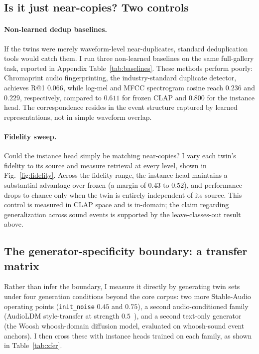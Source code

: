 \documentclass{article}
\begin{document}
\subsection{Is it just near-copies? Two controls}
\paragraph{Non-learned dedup baselines.} If the twins were merely waveform-level near-duplicates, standard deduplication tools would catch them. I run three non-learned baselines on the same full-gallery task, reported in Appendix Table~\ref{tab:baselines}. These methods perform poorly: Chromaprint audio fingerprinting, the industry-standard duplicate detector, achieves R@1 $0.066$, while log-mel and MFCC spectrogram cosine reach $0.236$ and $0.229$, respectively, compared to $0.611$ for frozen CLAP and $0.800$ for the instance head. The correspondence resides in the event structure captured by learned representations, not in simple waveform overlap.

\paragraph{Fidelity sweep.} Could the instance head simply be matching near-copies? I vary each twin's fidelity to its source and measure retrieval at every level, shown in Fig.~\ref{fig:fidelity}. Across the fidelity range, the instance head maintains a substantial advantage over frozen (a margin of $0.43$ to $0.52$), and performance drops to chance only when the twin is entirely independent of its source. This control is measured in CLAP space and is in-domain; the claim regarding generalization across sound events is supported by the leave-classes-out result above.

\subsection{The generator-specificity boundary: a transfer matrix}
\label{sec:xfer}
Rather than infer the boundary, I measure it directly by generating twin sets under four generation conditions beyond the core corpus: two more Stable-Audio operating points (\texttt{init\_noise} $0.45$ and $0.75$), a second audio-conditioned family (AudioLDM style-transfer at strength $0.5$~\citep{liu2023audioldm}), and a second text-only generator (the Woosh whoosh-domain diffusion model, evaluated on whoosh-sound event anchors). I then cross these with instance heads trained on each family, as shown in Table~\ref{tab:xfer}.
\end{document}
